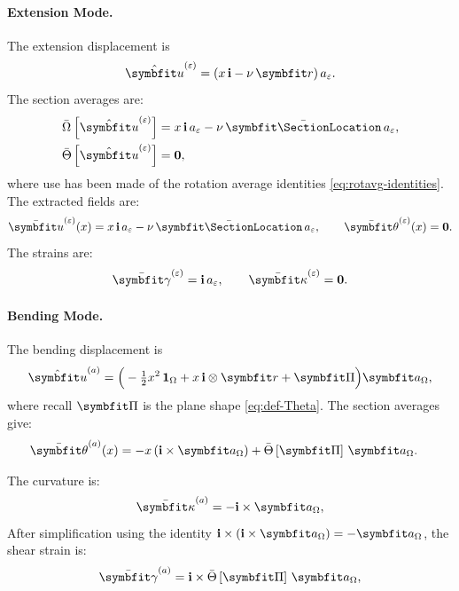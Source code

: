 \paragraph{Extension Mode.}
The extension displacement is
\begin{equation*}
\hat{\bm{u}}^{(\varepsilon)} = (x\,\FrameBasis - \nu\,\bm{r})\,a_{\varepsilon}.
\end{equation*}
The section averages are:
\begin{align*}
\SectionAverage{\hat{\bm{u}}^{(\varepsilon)}} &= x\,\FrameBasis\,a_\varepsilon - \nu\,\CentroidLocation\,a_\varepsilon, \\
\RotationAverage{\hat{\bm{u}}^{(\varepsilon)}} &= \mathbf{0},
\end{align*}
where use has been made of the rotation average identities \eqref{eq:rotavg-identities}. 
The extracted fields are:
\begin{equation*}
\bar{\bm{u}}^{(\varepsilon)}(x) = x\,\FrameBasis\,a_\varepsilon - \nu\,\CentroidLocation\,a_\varepsilon, 
\qquad 
\bar{\bm{\theta}}^{(\varepsilon)}(x) = \mathbf{0}.
\end{equation*}
The strains are:
\begin{equation*}
\bar{\bm{\gamma}}^{(\varepsilon)} = \FrameBasis\,a_\varepsilon, 
\qquad 
\bar{\bm{\kappa}}^{(\varepsilon)} = \mathbf{0}.
\end{equation*}

\paragraph{Bending Mode.} 
The bending displacement is
\begin{equation*}
\hat{\bm{u}}^{(a)} = \Big( -\tfrac{1}{2}x^2\,\mathbf{1}_\Omega 
+ x\,\FrameBasis \otimes \bm{r} 
+ \PlaneShape \Big) \bm{a}_\Omega,
\end{equation*}
where recall $\PlaneShape$ is the plane shape \eqref{eq:def-Theta}. 
The section averages give:
\begin{align*}
\bar{\bm{\theta}}^{(a)}(x) &= -x\,(\FrameBasis \times \bm{a}_\Omega) 
+ \RotationAverage{\PlaneShape}\,\bm{a}_\Omega.
\end{align*}

The curvature is:
\begin{equation*}
\bar{\bm{\kappa}}^{(a)} = -\FrameBasis \times \bm{a}_\Omega,
\end{equation*}
After simplification using the identity 
$\FrameBasis \times (\FrameBasis \times \bm{a}_\Omega) = -\bm{a}_\Omega$, 
the shear strain is:
\begin{equation*}
\bar{\bm{\gamma}}^{(a)} = \FrameBasis \times \RotationAverage{\PlaneShape}\,\bm{a}_\Omega,
\end{equation*}

